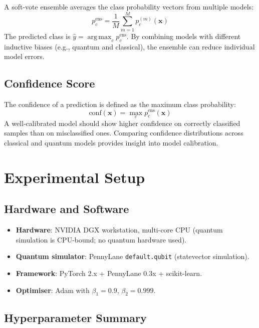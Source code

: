 \documentclass[12pt, a4paper]{article}
\newcommand{\vect}[1]{\boldsymbol{#1}}
\DeclareMathOperator{\argmax}{arg\,max}
\begin{document}
A soft-vote ensemble averages the class probability vectors from multiple models:
\begin{equation}
    p_c^{\text{ens}} = \frac{1}{M} \sum_{m=1}^{M} p_c^{(m)}(\vect{x})
\end{equation}
The predicted class is $\hat{y} = \argmax_c p_c^{\text{ens}}$.
By combining models with different inductive biases (e.g., quantum and classical),
the ensemble can reduce individual model errors.

\subsection{Confidence Score}

The confidence of a prediction is defined as the maximum class probability:
\begin{equation}
    \text{conf}(\vect{x}) = \max_c p_c^{\text{ens}}(\vect{x})
\end{equation}
A well-calibrated model should show higher confidence on correctly classified
samples than on misclassified ones. Comparing confidence distributions across
classical and quantum models provides insight into model calibration.

\section{Experimental Setup}
\label{sec:experiments}

\subsection{Hardware and Software}

\begin{itemize}
    \item \textbf{Hardware}: NVIDIA DGX workstation, multi-core CPU (quantum
          simulation is CPU-bound; no quantum hardware used).
    \item \textbf{Quantum simulator}: PennyLane \texttt{default.qubit}
          (statevector simulation).
    \item \textbf{Framework}: PyTorch 2.x + PennyLane 0.3x + scikit-learn.
    \item \textbf{Optimiser}: Adam with $\beta_1 = 0.9$, $\beta_2 = 0.999$.
\end{itemize}

\subsection{Hyperparameter Summary}
\end{document}
